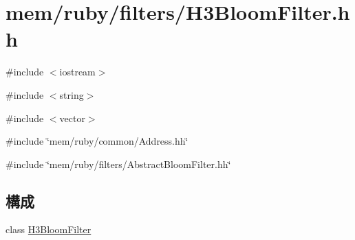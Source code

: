 \hypertarget{H3BloomFilter_8hh}{
\section{mem/ruby/filters/H3BloomFilter.hh}
\label{H3BloomFilter_8hh}
}
{\ttfamily \#include $<$iostream$>$}\par
{\ttfamily \#include $<$string$>$}\par
{\ttfamily \#include $<$vector$>$}\par
{\ttfamily \#include \char`\"{}mem/ruby/common/Address.hh\char`\"{}}\par
{\ttfamily \#include \char`\"{}mem/ruby/filters/AbstractBloomFilter.hh\char`\"{}}\par
\subsection*{構成}
\begin{DoxyCompactItemize}
\item 
class \hyperlink{classH3BloomFilter}{H3BloomFilter}
\end{DoxyCompactItemize}
